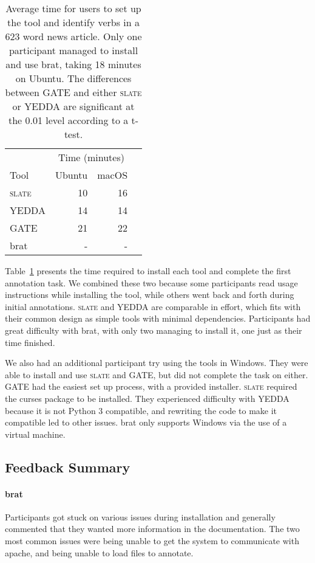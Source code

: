 \documentclass[11pt,a4paper]{article}
\newcommand\slate{\textsc{slate}\xspace}
\begin{document}
\begin{table}
  \centering
  \small
  \begin{tabular}{lrrr}
    \toprule
           & \multicolumn{2}{c}{Time (minutes)} \\
    Tool   & Ubuntu & macOS \\
    \midrule
    \slate & 10 & 16 \\
    YEDDA  & 14 & 14 \\
    GATE   & 21 & 22 \\
    brat   &  - &  - \\
    \bottomrule
  \end{tabular}
  \caption{\label{tab:study}
  Average time for users to set up the tool and identify verbs in a 623 word news article.
  Only one participant managed to install and use brat, taking 18 minutes on Ubuntu.
  The differences between GATE and either \slate or YEDDA are significant at the 0.01 level according to a t-test.
  }
\end{table}

Table~\ref{tab:study} presents the time required to install each tool and complete the first annotation task.
We combined these two because some participants read usage instructions while installing the tool, while others went back and forth during initial annotations.
\slate and YEDDA are comparable in effort, which fits with their common design as simple tools with minimal dependencies.
Participants had great difficulty with brat, with only two managing to install it, one just as their time finished.

We also had an additional participant try using the tools in Windows.
They were able to install and use \slate and GATE, but did not complete the task on either.
GATE had the easiest set up process, with a provided installer.
\slate required the curses package to be installed.
They experienced difficulty with YEDDA because it is not Python 3 compatible, and rewriting the code to make it compatible led to other issues.
brat only supports Windows via the use of a virtual machine.

\subsection{Feedback Summary}

\paragraph{brat}
Participants got stuck on various issues during installation and generally commented that they wanted more information in the documentation.
The two most common issues were being unable to get the system to communicate with apache, and being unable to load files to annotate.
\end{document}
